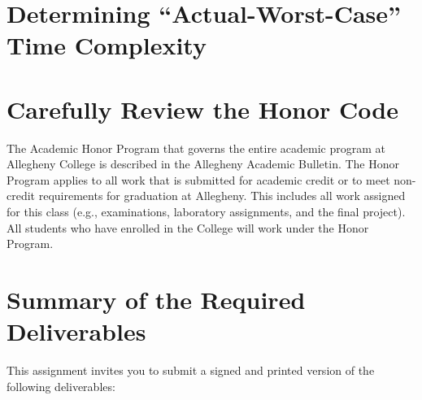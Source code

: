 \section*{Determining ``Actual-Worst-Case'' Time Complexity}

\section*{Carefully Review the Honor Code}

The Academic Honor Program that governs the entire academic program at Allegheny College is described in the Allegheny
Academic Bulletin. The Honor Program applies to all work that is submitted for academic credit or to meet non-credit
requirements for graduation at Allegheny. This includes all work assigned for this class (e.g., examinations, laboratory
assignments, and the final project). All students who have enrolled in the College will work under the Honor Program.



\section*{Summary of the Required Deliverables}

This assignment invites you to submit a signed and printed version of the following deliverables:

